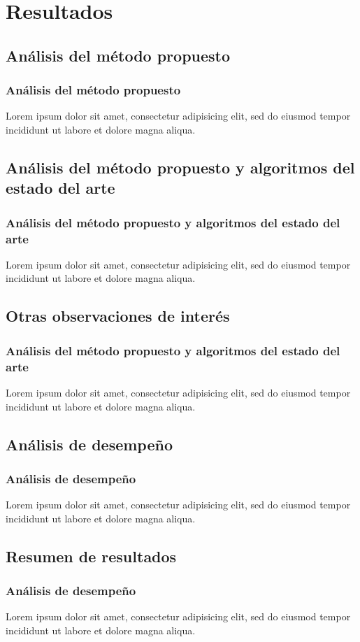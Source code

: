 \section{Resultados}

\subsection{Análisis del método propuesto}
\begin{frame}[allowframebreaks]
	\frametitle{Análisis del método propuesto}
	Lorem ipsum dolor sit amet, consectetur adipisicing elit, sed do eiusmod tempor incididunt ut labore et dolore magna aliqua.
\end{frame}

\subsection{Análisis del método propuesto y algoritmos del estado del arte}
\begin{frame}[allowframebreaks]
	\frametitle{Análisis del método propuesto y algoritmos del estado del arte}
	Lorem ipsum dolor sit amet, consectetur adipisicing elit, sed do eiusmod tempor incididunt ut labore et dolore magna aliqua.
\end{frame}

\subsection{Otras observaciones de interés}
\begin{frame}[allowframebreaks]
	\frametitle{Análisis del método propuesto y algoritmos del estado del arte}
	Lorem ipsum dolor sit amet, consectetur adipisicing elit, sed do eiusmod tempor incididunt ut labore et dolore magna aliqua.
\end{frame}

\subsection{Análisis de desempeño}
\begin{frame}[allowframebreaks]
	\frametitle{Análisis de desempeño}
	Lorem ipsum dolor sit amet, consectetur adipisicing elit, sed do eiusmod tempor incididunt ut labore et dolore magna aliqua.
\end{frame}

\subsection{Resumen de resultados}
\begin{frame}[allowframebreaks]
	\frametitle{Análisis de desempeño}
	Lorem ipsum dolor sit amet, consectetur adipisicing elit, sed do eiusmod tempor incididunt ut labore et dolore magna aliqua.
\end{frame}